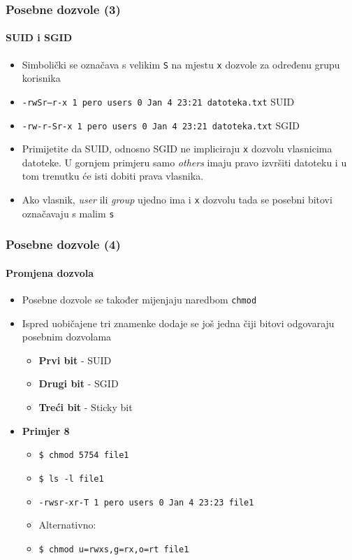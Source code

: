 \documentclass[table,usenames,dvipsnames] {beamer}
\newcommand{\shell}[1]{\texttt{#1}}
\begin{document}
\begin{frame}[t]
  \frametitle{Posebne dozvole (3)}
  \framesubtitle{SUID i SGID}
\begin{itemize}
  \item Simbolički se označava s velikim \shell{S} na mjestu \shell{x} dozvole za određenu grupu korisnika
  \item[] {\footnotesize \shell{-rwSr--r-x 1 pero users 0 Jan  4 23:21 datoteka.txt} \hfill SUID }
  \item[] {\footnotesize \shell{-rw-r-Sr-x 1 pero users 0 Jan  4 23:21 datoteka.txt} \hfill SGID }
\end{itemize}
\begin{itemize}
  \item Primijetite da SUID, odnosno SGID ne impliciraju \shell{x} dozvolu vlasnicima datoteke. U gornjem primjeru samo \textit{others} imaju pravo izvršiti datoteku i u tom trenutku će isti dobiti prava vlasnika.
  \item Ako vlasnik, \textit{user} ili \textit{group} ujedno ima i \shell{x} dozvolu tada se posebni bitovi označavaju s malim \shell{s}
\end{itemize}
\end{frame}

\begin{frame}
  \frametitle{Posebne dozvole (4)}
  \framesubtitle{Promjena dozvola}
\begin{itemize}
  \item Posebne dozvole se također mijenjaju naredbom \shell{chmod}
  \item Ispred uobičajene tri znamenke dodaje se još jedna čiji bitovi odgovaraju posebnim dozvolama
  \begin{itemize}
    \item \textbf{Prvi bit} - SUID
    \item \textbf{Drugi bit} - SGID
    \item \textbf{Treći bit} - Sticky bit
  \end{itemize}
\end{itemize}
\begin{itemize}
  \item \textbf{Primjer 8}
  \begin{itemize}
    \item[] \shell{\$ chmod 5754 file1}
    \item[] \shell{\$ ls -l file1}
    \item[] \shell{-rwsr-xr-T 1 pero users 0 Jan  4 23:23 file1}
    \item \vspace{1em} Alternativno:
    \item[] \shell{\$ chmod u=rwxs,g=rx,o=rt file1}
  \end{itemize}
\end{itemize}
\end{frame}
\end{document}

